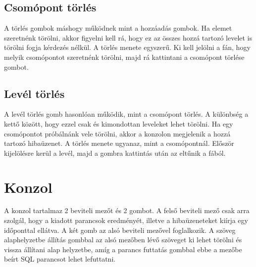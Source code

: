 \subsection{Csomópont törlés} A törlés gombok máshogy működnek mint a hozzáadás gombok. Ha elemet szeretnénk törölni, akkor figyelni kell rá, hogy ez az összes hozzá tartozó levelet is törölni fogja kérdezés nélkül. A törlés menete egyszerű. Ki kell jelölni a fán, hogy melyik csomópontot szeretnénk törölni, majd rá kattintani a csomópont törlése gombot.

\subsection{Levél törlés} A levél törlés gomb hasonlóan működik, mint a csomópont törlés. A különbség a kettő között, hogy ezzel csak és kimondottan leveleket lehet törölni. Ha egy csomópontot próbálnánk vele törölni, akkor a konzolon megjelenik a hozzá tartozó hibaüzenet. A törlés menete ugyanaz, mint a csomópontnál. Először kijelölésre kerül a levél, majd a gombra kattintás után az eltűnik a fából.

\section{Konzol} A konzol tartalmaz 2 beviteli mezőt és 2 gombot. A felső beviteli mező csak arra szolgál, hogy a kiadott parancsok eredményét, illetve a hibaüzeneteket kiírja egy időponttal ellátva. A két gomb az alsó beviteli mezővel foglalkozik. A szöveg alaphelyzetbe állítás gombbal az alsó mezőben lévő szöveget ki lehet törölni és vissza állítani alap helyzetbe, amíg a parancs futtatás gombbal ebbe a mezőbe beírt SQL parancsot lehet lefuttatni.


